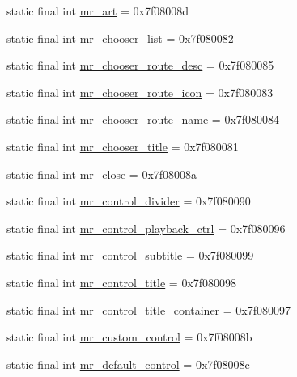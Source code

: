 \begin{CompactItemize}
static final int \hyperlink{classandroid_1_1support_1_1coreutils_1_1_r_1_1id_64be395f1b8337040a4a20583099b302}{mr\_\-art} = 0x7f08008d
\item 
static final int \hyperlink{classandroid_1_1support_1_1coreutils_1_1_r_1_1id_2643c9e61e21286347b0154eb7b06228}{mr\_\-chooser\_\-list} = 0x7f080082
\item 
static final int \hyperlink{classandroid_1_1support_1_1coreutils_1_1_r_1_1id_f1e6fe1ccfc2a45681a21aa922b76c53}{mr\_\-chooser\_\-route\_\-desc} = 0x7f080085
\item 
static final int \hyperlink{classandroid_1_1support_1_1coreutils_1_1_r_1_1id_ee579d36cd5490e856558b17af423c4d}{mr\_\-chooser\_\-route\_\-icon} = 0x7f080083
\item 
static final int \hyperlink{classandroid_1_1support_1_1coreutils_1_1_r_1_1id_c960e05011fac2a61b8c50697fd5612e}{mr\_\-chooser\_\-route\_\-name} = 0x7f080084
\item 
static final int \hyperlink{classandroid_1_1support_1_1coreutils_1_1_r_1_1id_f4571b509ab9b4cc1833beb75863f9df}{mr\_\-chooser\_\-title} = 0x7f080081
\item 
static final int \hyperlink{classandroid_1_1support_1_1coreutils_1_1_r_1_1id_40e410dd741f3dfc204dc9a41efab37a}{mr\_\-close} = 0x7f08008a
\item 
static final int \hyperlink{classandroid_1_1support_1_1coreutils_1_1_r_1_1id_498416ed7c7ead2b2b94c4a6aed2d1ba}{mr\_\-control\_\-divider} = 0x7f080090
\item 
static final int \hyperlink{classandroid_1_1support_1_1coreutils_1_1_r_1_1id_9180eee04fc15f5281f40c31f52ed5c1}{mr\_\-control\_\-playback\_\-ctrl} = 0x7f080096
\item 
static final int \hyperlink{classandroid_1_1support_1_1coreutils_1_1_r_1_1id_91ccf2ff920f0e6ee9d85fca0af4f0cd}{mr\_\-control\_\-subtitle} = 0x7f080099
\item 
static final int \hyperlink{classandroid_1_1support_1_1coreutils_1_1_r_1_1id_960bdf5c2b588911ba093bad004a49fe}{mr\_\-control\_\-title} = 0x7f080098
\item 
static final int \hyperlink{classandroid_1_1support_1_1coreutils_1_1_r_1_1id_3b1bd803744b54ecf80283a8dda2ced1}{mr\_\-control\_\-title\_\-container} = 0x7f080097
\item 
static final int \hyperlink{classandroid_1_1support_1_1coreutils_1_1_r_1_1id_b3f23e2201ba67095e47c96b0029c3cf}{mr\_\-custom\_\-control} = 0x7f08008b
\item 
static final int \hyperlink{classandroid_1_1support_1_1coreutils_1_1_r_1_1id_dd1d57252810bf62f24f7f5264c54c86}{mr\_\-default\_\-control} = 0x7f08008c

\end{CompactItemize}
